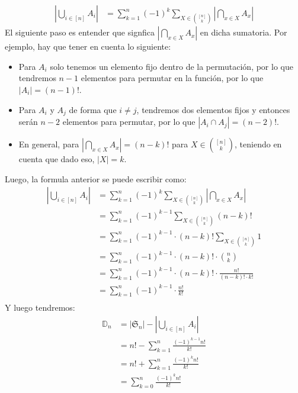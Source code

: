 \documentclass[12pt,a4paper,oneside]{memoir}
\begin{document}
\begin{align*}
    \left|\bigcup_{i \in [n]} A_i\right| &= \sum_{k = 1}^n (-1)^k \sum_{X \in \binom{[n]}{k}} \left|\bigcap_{x \in X} A_x\right|
\end{align*}
El siguiente paso es entender que signfica $\left|\bigcap_{x \in X} A_x\right|$ en dicha sumatoria. Por ejemplo, hay que tener en cuenta lo siguiente:
\begin{itemize}
    \item Para $A_i$ solo tenemos un elemento fijo dentro de la permutación, por lo que tendremos $n-1$ elementos para permutar en la función, por lo que $|A_i| = (n-1)!$.
    \item Para $A_i$ y $A_j$ de forma que $i \neq j$, tendremos dos elementos fijos y entonces serán $n-2$ elementos para permutar, por lo que $|A_i \cap A_j| = (n-2)!$.
    \item En general, para $\left|\bigcap_{x \in X} A_x\right| = (n-k)!$ para $X \in \binom{[n]}{k}$, teniendo en cuenta que dado eso, $|X| = k$. 
\end{itemize}
Luego, la formula anterior se puede escribir como:
\begin{align*}
    \left|\bigcup_{i \in [n]} A_i\right| &= \sum_{k = 1}^n (-1)^k \sum_{X \in \binom{[n]}{k}} \left|\bigcap_{x \in X} A_x\right|\\
    &= \sum_{k = 1}^n (-1)^{k-1} \sum_{X \in \binom{[n]}{k}} (n-k)!\\
    &= \sum_{k = 1}^n (-1)^{k-1} \cdot (n-k)! \sum_{X \in \binom{[n]}{k}} 1\\
    &= \sum_{k = 1}^n (-1)^{k-1} \cdot (n-k)! \cdot \binom{n}{k}\\
    &= \sum_{k = 1}^n (-1)^{k-1} \cdot (n-k)! \cdot \frac{n!}{(n-k)! \cdot k!}\\
    &= \sum_{k = 1}^n (-1)^{k-1} \cdot \frac{n!}{k!}\\
\end{align*}
Y luego tendremos:
\begin{align*}
    \mathbb{D}_n &= |\mathfrak{S}_n| - \left|\bigcup_{i \in [n]} A_i\right|\\
    &= n! - \sum_{k = 1}^n \frac{(-1)^{k-1} n!}{k!}\\
    &= n! + \sum_{k = 1}^n \frac{(-1)^kn!}{k!}\\
    &= \sum_{k = 0}^n \frac{(-1)^kn!}{k!}
\end{align*}
\end{document}
